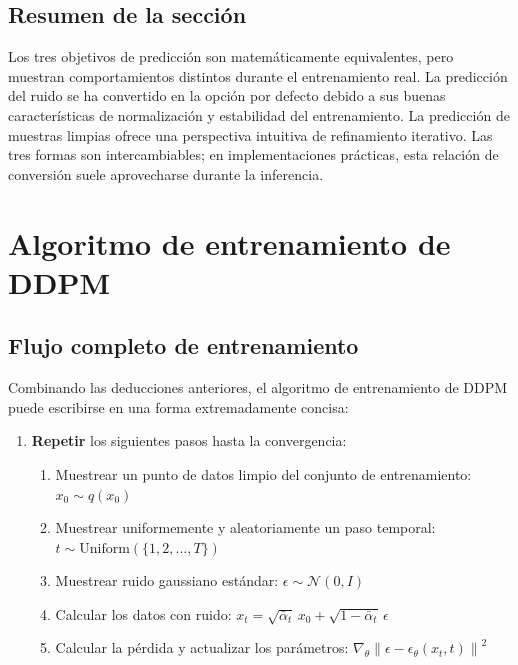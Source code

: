 \documentclass[a4paper]{article}
\begin{document}
\subsection{Resumen de la sección}

Los tres objetivos de predicción son matemáticamente equivalentes, pero muestran comportamientos distintos durante el entrenamiento real. La predicción del ruido se ha convertido en la opción por defecto debido a sus buenas características de normalización y estabilidad del entrenamiento. La predicción de muestras limpias ofrece una perspectiva intuitiva de refinamiento iterativo. Las tres formas son intercambiables; en implementaciones prácticas, esta relación de conversión suele aprovecharse durante la inferencia.

\section{Algoritmo de entrenamiento de DDPM}

\subsection{Flujo completo de entrenamiento}

Combinando las deducciones anteriores, el algoritmo de entrenamiento de DDPM puede escribirse en una forma extremadamente concisa:

\begin{enumerate}
    \item \textbf{Repetir} los siguientes pasos hasta la convergencia:
    \begin{enumerate}
        \item Muestrear un punto de datos limpio del conjunto de entrenamiento: $x_0 \sim q(x_0)$
        \item Muestrear uniformemente y aleatoriamente un paso temporal: $t \sim \text{Uniform}(\{1, 2, \dots, T\})$
        \item Muestrear ruido gaussiano estándar: $\epsilon \sim \mathcal{N}(0, I)$
        \item Calcular los datos con ruido: $x_t = \sqrt{\bar{\alpha}_t}\, x_0 + \sqrt{1 - \bar{\alpha}_t}\, \epsilon$
        \item Calcular la pérdida y actualizar los parámetros: $\nabla_\theta \left\| \epsilon - \epsilon_\theta(x_t, t) \right\|^2$
    \end{enumerate}
\end{enumerate}
\end{document}
